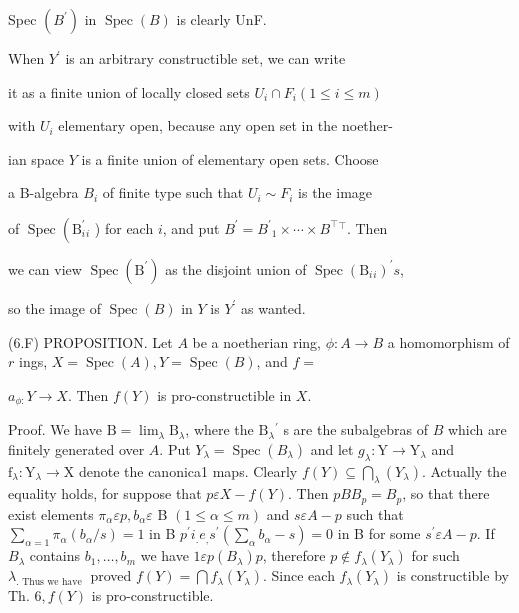 Spec $\left(B^{\prime}\right)$ in $\operatorname{Spec}(B)$ is clearly UnF.

When $Y^{\prime}$ is an arbitrary constructible set, we can write

it as a finite union of locally closed sets $U_{i} \cap F_{i}(1 \leqslant i \leqslant m)$

with $U_{i}$ elementary open, because any open set in the noether-

ian space $Y$ is a finite union of elementary open sets. Choose

a B-algebra $B_{i}$ of finite type such that $U_{i} \sim F_{i}$ is the image

of $\operatorname{Spec}\left(\mathrm{B}_{i}^{\prime}{ }_{i}\right.$ ) for each $i$, and put $B^{\prime}=B^{\prime}{ }_{1} \times \cdots \times B^{\top}{ }^{\top}$. Then

we can view $\operatorname{Spec}\left(\mathrm{B}^{\prime}\right)$ as the disjoint union of $\operatorname{Spec}\left(\mathrm{B}_{i}{ }_{i}\right)^{\prime} s$,

so the image of $\operatorname{Spec}(B)$ in $Y$ is $Y^{\prime}$ as wanted.

(6.F) PROPOSITION. Let $A$ be a noetherian ring, $\phi: A \rightarrow B$ a homomorphism of $r$ ings, $X=\operatorname{Spec}(A), Y=\operatorname{Spec}(B)$, and $f=$

$a_{\phi:} Y \rightarrow X$. Then $f(Y)$ is pro-constructible in $X$.

Proof. We have $\mathrm{B}=\lim _{\lambda} \mathrm{B}_{\lambda}$, where the $\mathrm{B}_{\lambda}{ }^{\prime}$ s are the subalgebras of $B$ which are finitely generated over $A$. Put $Y_{\lambda}=\operatorname{Spec}\left(B_{\lambda}\right)$ and let $g_{\lambda}: \mathrm{Y} \rightarrow \mathrm{Y}_{\lambda}$ and $\mathrm{f}_{\lambda}: \mathrm{Y}_{\lambda} \rightarrow \mathrm{X}$ denote the canonica1 maps. Clearly $f(Y) \subseteq \bigcap_{\lambda}\left(Y_{\lambda}\right)$. Actually the equality holds, for suppose that $p \varepsilon X-f(Y)$. Then $p B B_{p}=B_{p}$, so that there exist elements $\pi_{\alpha} \varepsilon p, b_{\alpha} \varepsilon$ B $(1 \leqslant \alpha \leqslant m)$ and $s \varepsilon A-p$ such that $\sum_{\alpha=1} \pi_{\alpha}\left(b_{\alpha} / s\right)=1$ in B $p^{\prime} i_{.} e_{,} s^{\prime}\left(\sum_{\alpha} b_{\alpha}-s\right)=0$ in B for some $s^{\prime} \varepsilon A-p$. If $B_{\lambda}$ contains $b_{1}, \ldots, b_{m}$ we have $1 \varepsilon p\left(B_{\lambda}\right) p$, therefore $p \notin f_{\lambda}\left(Y_{\lambda}\right)$ for such $\lambda_{\text {. Thus we have }}$ proved $f(Y)=\bigcap f_{\lambda}\left(Y_{\lambda}\right)$. Since each $f_{\lambda}\left(Y_{\lambda}\right)$ is constructible by Th. $6, f(Y)$ is pro-constructible.

